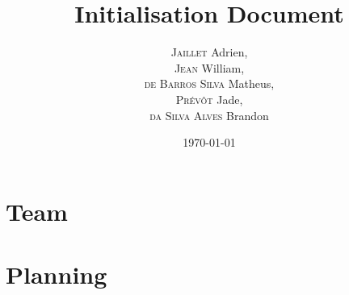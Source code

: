 \documentclass{report}
\title{Initialisation Document}
\author{\textsc{Jaillet} Adrien,\\
		\textsc{Jean} William,\\
		\textsc{de Barros Silva} Matheus,\\
		\textsc{Prévôt} Jade,\\
		\textsc{da Silva Alves} Brandon}
\date{\today}
\begin{document}
	\maketitle
	\begin{abstract}
	\end{abstract}
	\tableofcontents
	\chapter{Team}
	\chapter{Planning}
\end{document}
